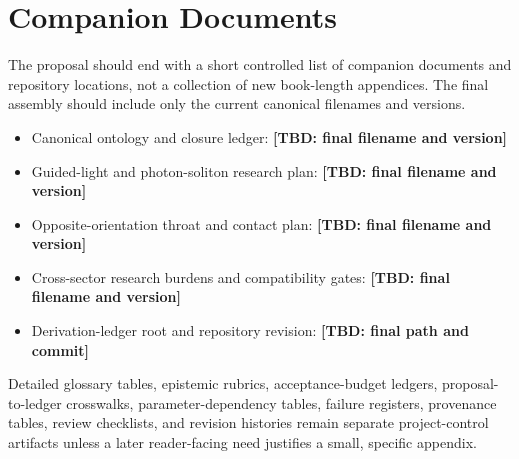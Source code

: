 \documentclass[11pt,oneside]{report}
\newcommand{\TBD}[1]{\textcolor{ProposalRed}{\textbf{[TBD: #1]}}}
\begin{document}
\chapter*{Companion Documents}

The proposal should end with a short controlled list of companion documents and
repository locations, not a collection of new book-length appendices. The final
assembly should include only the current canonical filenames and versions.

\begin{itemize}[leftmargin=2em]
  \item Canonical ontology and closure ledger: \TBD{final filename and version}
  \item Guided-light and photon-soliton research plan: \TBD{final filename and version}
  \item Opposite-orientation throat and contact plan: \TBD{final filename and version}
  \item Cross-sector research burdens and compatibility gates: \TBD{final filename and version}
  \item Derivation-ledger root and repository revision: \TBD{final path and commit}
\end{itemize}

\begin{scopebox}
Detailed glossary tables, epistemic rubrics, acceptance-budget ledgers,
proposal-to-ledger crosswalks, parameter-dependency tables, failure registers,
provenance tables, review checklists, and revision histories remain separate
project-control artifacts unless a later reader-facing need justifies a small,
specific appendix.
\end{scopebox}
\end{document}
